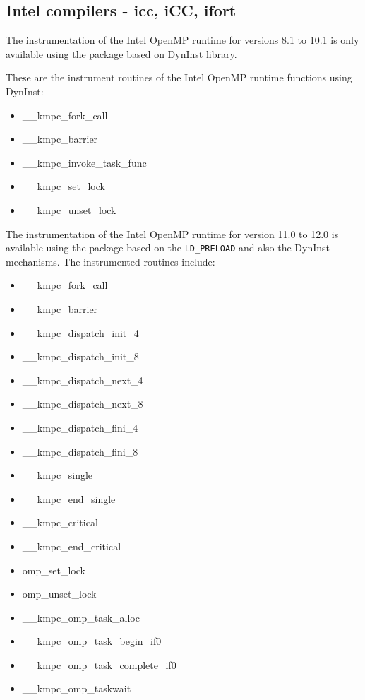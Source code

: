 \subsection{Intel compilers - icc, iCC, ifort}

The instrumentation of the Intel OpenMP runtime for versions 8.1 to 10.1 is only available using the \TRACE package based on DynInst library.

These are the instrument routines of the Intel OpenMP runtime functions using DynInst:

\begin{itemize}
\item \_\_kmpc\_fork\_call
\item \_\_kmpc\_barrier
\item \_\_kmpc\_invoke\_task\_func
\item \_\_kmpc\_set\_lock\footnotemark[4]
\item \_\_kmpc\_unset\_lock\footnotemark[4]
\end{itemize}

The instrumentation of the Intel OpenMP runtime for version 11.0 to 12.0 is available using the \TRACE package based on the {\tt LD\_PRELOAD} and also the DynInst mechanisms. The instrumented routines include:

\begin{itemize}
\item \_\_kmpc\_fork\_call
\item \_\_kmpc\_barrier
\item \_\_kmpc\_dispatch\_init\_4
\item \_\_kmpc\_dispatch\_init\_8
\item \_\_kmpc\_dispatch\_next\_4
\item \_\_kmpc\_dispatch\_next\_8
\item \_\_kmpc\_dispatch\_fini\_4
\item \_\_kmpc\_dispatch\_fini\_8
\item \_\_kmpc\_single
\item \_\_kmpc\_end\_single
\item \_\_kmpc\_critical\footnotemark[4]
\item \_\_kmpc\_end\_critical\footnotemark[4]
\item omp\_set\_lock\footnotemark[4]
\item omp\_unset\_lock\footnotemark[4]
\item \_\_kmpc\_omp\_task\_alloc
\item \_\_kmpc\_omp\_task\_begin\_if0
\item \_\_kmpc\_omp\_task\_complete\_if0
\item \_\_kmpc\_omp\_taskwait
\end{itemize}

